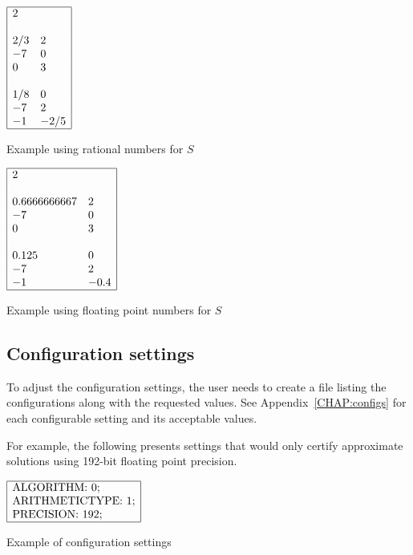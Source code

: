 \documentclass[11pt]{report}
\begin{document}
\begin{table}[h!]
\centering
$\begin{array}{|ll|}
\hline
2 & \\
 & \\
2/3 & 2\\
-7 & 0 \\
0 & 3 \\
 & \\
1/8 & 0 \\
-7 & 2 \\
-1 & -2/5 \\
\hline
\end{array}$
\caption{Example using rational numbers for $S$}\label{Tab:RatPts}
\end{table}

\begin{table}[h!]
\centering
$\begin{array}{|ll|}
\hline
2 & \\
 & \\
0.6666666667 & 2\\
-7 & 0 \\
0 & 3 \\
 & \\
0.125 & 0 \\
-7 & 2 \\
-1 & -0.4 \\
\hline
\end{array}$
\caption{Example using floating point numbers for $S$}\label{Tab:FloatPts}
\end{table}

\subsection{Configuration settings}\label{SEC:Settings}

To adjust the configuration settings, the user needs to create
a file listing the configurations along with the requested values.
See Appendix~\ref{CHAP:configs} for each configurable setting
and its acceptable values.

For example, the following presents settings that would
only certify approximate solutions using 192-bit floating point precision.

\begin{table}[h!]
\centering
$\begin{array}{|l|}
\hline
\hbox{ALGORITHM: 0;} \\
\hbox{ARITHMETICTYPE: 1;} \\
\hbox{PRECISION: 192;} \\
\hline
\end{array}$
\caption{Example of configuration settings}\label{Tab:Configs}
\end{table}
\end{document}
